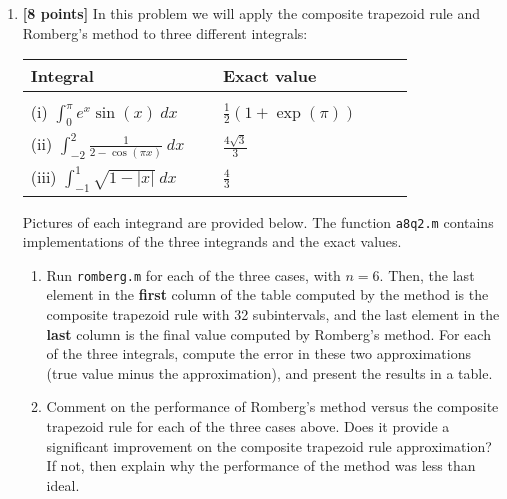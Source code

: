 \documentclass{article}
\begin{document}
\begin{enumerate}
\begin{enumerate}
\end{enumerate}
\newpage
\item {\bf [8 points]} In this problem we will apply the composite trapezoid rule and Romberg's method to three different integrals:

\begin{tabular}{p{0.4\linewidth}p{0.4\linewidth}}
Integral							&Exact value \\
\hline
\\	
(i) $\displaystyle \int_0^\pi e^{x} \sin(x) \: dx $				&$ \displaystyle \frac{1}{2} (1 +  \exp(\pi))$\\[12pt] 		
(ii) $\displaystyle \int_{-2}^2\frac{1}{2-\cos(\pi x)} \: dx$			&$\displaystyle \frac{4\sqrt{3}}{3}$ \\[12pt]
(iii) $\displaystyle \int_{-1}^1 \sqrt{1-|x|} \: dx$ 		&$ \displaystyle \frac{4}{3}$  
\end{tabular}

Pictures of each integrand are provided below. The function {\tt a8q2.m} contains implementations of the three integrands and the exact values.


\begin{enumerate}
\item Run {\tt romberg.m} for each of the three cases, with $n=6$. Then, the last element in the {\bf first} column of the table computed by the method is the composite trapezoid rule with 32 subintervals, and the last element in the {\bf last} column is the final value computed by Romberg's method. For each of the three integrals, compute the error in these two approximations (true value minus the approximation), and present the results in a table.

\item Comment on the performance of Romberg's method versus the composite trapezoid rule for each of the three cases above. Does it provide a significant improvement on the composite trapezoid rule approximation? If not, then explain why the performance of the method was less than ideal.
\end{enumerate}
\end{enumerate}
\end{document}
